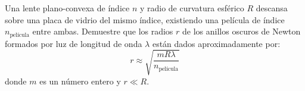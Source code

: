 \item Una lente plano-convexa de índice $n$ y radio de curvatura esférico $R$ descansa sobre una placa de vidrio del mismo índice, existiendo una película de índice $n_{\text{película}}$ entre ambas. Demuestre que los radios $r$ de los anillos oscuros de Newton formados por luz de longitud de onda $\lambda$ están dados aproximadamente por:
$$ r \approx \sqrt{\frac{m R \lambda}{n_{\text{película}}}} $$
donde $m$ es un número entero y $r \ll R$.